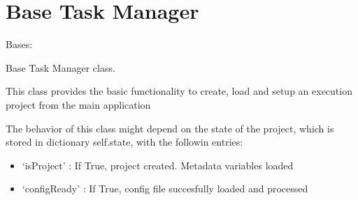 \documentclass[letterpaper,10pt,english]{sphinxmanual}
\begin{document}
\chapter{Base Task Manager}
\label{\detokenize{dc_base_taskmanager:base-task-manager}}\label{\detokenize{dc_base_taskmanager::doc}}\label{\detokenize{dc_base_taskmanager:module-src.base_taskmanager}}

\begin{fulllineitems}
\label{\detokenize{dc_base_taskmanager:src.base_taskmanager.baseTaskManager}}
\sphinxAtStartPar
Bases: 

\sphinxAtStartPar
Base Task Manager class.

\sphinxAtStartPar
This class provides the basic functionality to create, load and setup an
execution project from the main application

\sphinxAtStartPar
The behavior of this class might depend on the state of the project, which
is stored in dictionary self.state, with the followin entries:
\begin{itemize}
\item {} 
\sphinxAtStartPar
‘isProject’   : If True, project created. Metadata variables loaded

\item {} 
\sphinxAtStartPar
‘configReady’ : If True, config file succesfully loaded and processed

\end{itemize}


\end{fulllineitems}
\end{document}
